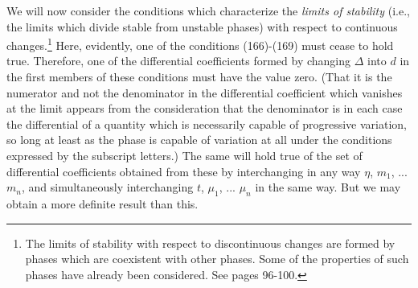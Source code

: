 \documentclass[12pt]{article}
\begin{document}
We will now consider the conditions which characterize the \textit{limits of stability} (i.e., the limits which divide stable from unstable phases) with respect to continuous changes.\footnote{The limits of stability with respect to discontinuous changes are formed by phases which are coexistent with other phases. Some of the properties of such phases have already been considered. See pages 96-100.} Here, evidently, one of the conditions (166)-(169) must cease to hold true. Therefore, one of the differential coefficients formed by changing $\Delta$ into $d$ in the first members of these conditions must have the value zero. (That it is the numerator and not the denominator in the differential coefficient which vanishes at the limit appears from the consideration that the denominator is in each case the differential of a quantity which is necessarily capable of progressive variation, so long at least as the phase is capable of variation at all under the conditions expressed by the subscript letters.) The same will hold true of the set of differential coefficients obtained from these by interchanging in any way $\eta$, $m_1$, ... $m_n$, and simultaneously interchanging $t$, $\mu_1$, ... $\mu_n$ in the same way. But we may obtain a more definite result than this.
\end{document}
